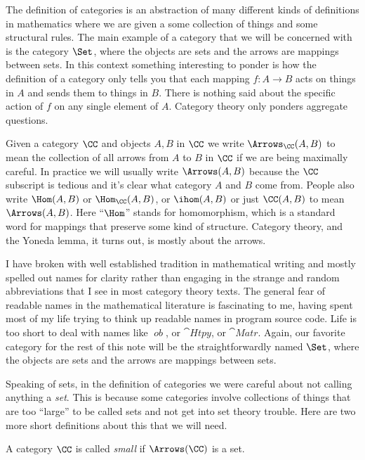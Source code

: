 \noindent
The definition of categories is an abstraction of many different kinds of definitions in
mathematics where we are given a some collection of things and some structural rules. The
main example of a category that we will be concerned with is the category $\Set$, where
the objects are sets and the arrows are mappings between sets. In this context something
interesting to ponder is how the definition of a category only tells you that each mapping
$f: A \to B$ acts on things in $A$ and sends them to things in $B$. There is nothing said
about the specific action of $f$ on any single element of $A$. Category theory only
ponders aggregate questions.

Given a category $\CC$ and objects $A, B$ in $\CC$ we write 
$\Arrows_{\CC}(A, B)$ to mean the collection of all arrows 
from $A$ to $B$ in $\CC$ if we are being maximally careful. In practice
we will usually write $\Arrows(A,B)$ because the $\CC$ subscript is tedious and
it's clear what category $A$ and $B$ come from. People
also write $\Hom(A, B)$ or $\Hom_{\CC}(A,B)$, or $\ihom(A, B)$ or just $\CC(A,B)$ to mean
$\Arrows(A,B)$. Here ``$\Hom$'' stands for homomorphism, which is a standard word for
mappings that preserve some kind of structure. Category theory, and the Yoneda lemma,
it turns out, is mostly about the arrows.

\goodbreak
I have broken with well established tradition in mathematical writing and mostly
spelled out names for clarity rather than engaging in the strange and random abbreviations
that I see in most category theory texts. The general fear of readable names in the
mathematical literature is fascinating to me, having spent most of my life trying to think
up readable names in program source code. Life is too short to deal with names like
$\mathop{\mathit{ob}}$, or $\cat{Htpy}$, or $\cat{Matr}$. Again, our favorite category for the
rest of this note will be the straightforwardly named $\Set$, where the objects are sets and the
arrows are mappings between sets.

Speaking of sets, in the definition of categories we were careful about not calling
anything a {\it set}. This is because some categories involve collections of things that
are too ``large'' to be called sets and not get into set theory trouble. Here are two more
short definitions about this that we will need.

\begin{defn}
A category $\CC$ is called {\it small} if $\Arrows(\CC)$ is a set.
\end{defn}


